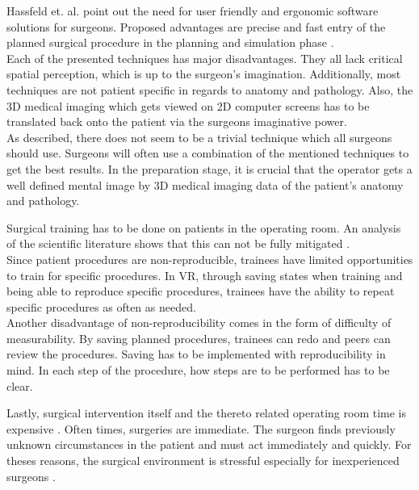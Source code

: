 Hassfeld et. al. point out the need for user friendly and ergonomic software solutions for surgeons.
Proposed advantages are precise and fast entry of the planned surgical procedure in the planning and simulation phase \cite{HASSFELD20012}.
\\ Each of the presented techniques has major disadvantages.
They all lack critical spatial perception, which is up to the surgeon's imagination.
Additionally, most techniques are not patient specific in regards to anatomy and pathology.
Also, the 3D medical imaging which gets viewed on 2D computer screens has to be translated back onto the patient via the surgeons imaginative power.
\\ As described, there does not seem to be a trivial technique which all surgeons should use.
Surgeons will often use a combination of the mentioned techniques to get the best results.
In the preparation stage, it is crucial that the operator gets a well defined mental image by 3D medical imaging data of the patient's anatomy and pathology.

Surgical training has to be done on patients in the operating room.
An analysis of the scientific literature shows that this can not be fully mitigated \cite{mcgaghie2011does}.
\\ Since patient procedures are non-reproducible, trainees have limited opportunities to train for specific procedures.
In VR, through saving states when training and being able to reproduce specific procedures, trainees have the ability to repeat specific procedures as often as needed.
\\ Another disadvantage of non-reproducibility comes in the form of difficulty of measurability.
By saving planned procedures, trainees can redo and peers can review the procedures.
Saving has to be implemented with reproducibility in mind.
In each step of the procedure, how steps are to be performed has to be clear.

Lastly, surgical intervention itself and the thereto related operating room time is expensive \cite{Barber.2020}.
Often times, surgeries are immediate.
The surgeon finds previously unknown circumstances in the patient and must act immediately and quickly.
For theses reasons, the surgical environment is stressful especially for inexperienced surgeons \cite{schuetz2008three}.